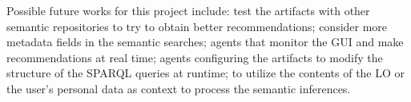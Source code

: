 \documentclass[a4paper,twoside]{article}
\begin{document}
Possible future works for this project include: test the artifacts with other semantic repositories to try to obtain better recommendations; consider more metadata fields in the semantic searches; agents that monitor the GUI and make recommendations at real time; agents configuring the artifacts to modify the structure of the SPARQL queries at runtime; to utilize the contents of the LO or the user's personal data as context to process the semantic inferences.

\vfill

{\small
}

\vfill
\end{document}

